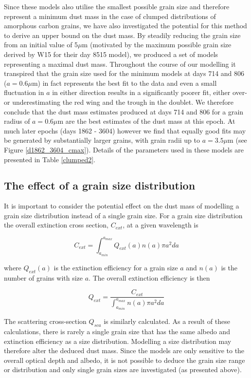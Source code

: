 \documentclass[useAMS,usenatbib,usegraphicx]{mnras}
\begin{document}
Since these models also utilise the smallest possible grain size and 
therefore represent a minimum dust mass in the case of 
clumped distributions of amorphous carbon grains, we have also investigated the 
potential for this method to derive an upper bound on the dust mass.  By 
steadily reducing the grain size from an initial value of 5$\mu$m 
(motivated by the maximum possible grain size derived by W15 for their day 
8515 model), we produced a set of models representing a maximal 
dust mass.  Throughout the course of our modelling it transpired that the 
grain size used for the minimum models at days 714 and 806 ($a=0.6\mu$m) 
in fact represents the best fit to the data and even a small fluctuation 
in $a$ in either direction results in a significantly poorer fit, either 
over- or underestimating the red wing and the trough in the doublet.  We 
therefore conclude that the dust mass estimates produced at days 714 and 
806 for a grain radius of $a=0.6\mu$m are the best estimates of the dust mass 
at this epoch.  At much later epochs (days 1862 - 3604) however we find that equally good fits may 
be generated by substantially larger grains, with grain radii up to $a=3.5\mu$m (see Figure 
\ref{d1862_3604_cmax}).  Details of the parameters used in these models are
presented in Table \ref{clumped2}.


\subsection{The effect of a grain size distribution}
\label{gs_distn}
It is important to consider the potential effect on the dust mass of modelling a grain size distribution instead of a single grain size.  For a grain size distribution the overall extinction cross section, $C_{ext}$, at a given wavelength is 

\begin{equation}
 C_{ext}=\int^{a_{max}}_{a_{min}} Q_{ext}(a) n(a) \pi a^2 da 
 \end{equation}

where $Q_{ext}(a)$ is the extinction efficiency for a grain size $a$ and $n(a)$ is the number of grains with size $a$. The overall extinction efficiency is then

\begin{equation}
 Q_{ext} = \frac{C_{ext}}{ \int^{a_{max}}_{a_{min}} n(a) \pi a^2 da} 
 \end{equation}
 
The scattering cross-section $Q_{sca}$ is similarly calculated.  As a result of these calculations, there is rarely a single grain size that has the same albedo and extinction efficiency as a size distribution.  Modelling a size distribution may therefore alter the deduced dust mass.  Since the models are only sensitive to the overall optical depth and albedo, it is not possible to deduce the grain size range or distribution and only single grain sizes are investigated (as presented above).
\end{document}
